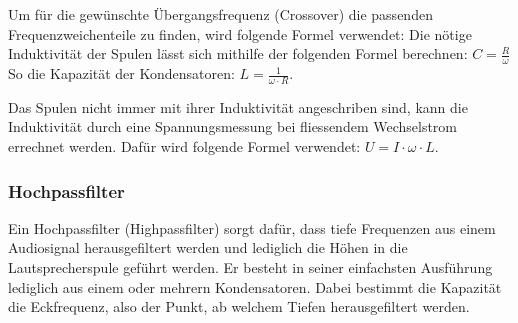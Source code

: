 \documentclass[a4paper,11pt]{report}
\begin{document}
Um für die gewünschte Übergangsfrequenz (Crossover) die passenden Frequenzweichenteile zu finden, wird folgende Formel verwendet:
Die nötige Induktivität der Spulen lässt sich mithilfe der folgenden Formel berechnen: $C = \frac{R}{\omega}$ 
So die Kapazität der Kondensatoren: $L = \frac{1}{\omega \cdot R}$.

Das Spulen nicht immer mit ihrer Induktivität angeschriben sind, kann die Induktivität durch eine Spannungsmessung bei fliessendem Wechselstrom errechnet werden. Dafür wird folgende Formel verwendet: $U = I \cdot \omega \cdot L$.

\subsubsection*{Hochpassfilter}
Ein Hochpassfilter (Highpassfilter) sorgt dafür, dass tiefe Frequenzen aus einem Audiosignal herausgefiltert werden und lediglich die Höhen in die Lautsprecherspule geführt werden. Er besteht in seiner einfachsten Ausführung lediglich aus einem oder mehrern Kondensatoren. Dabei bestimmt die Kapazität die Eckfrequenz, also der Punkt, ab welchem Tiefen herausgefiltert werden.
\end{document}
